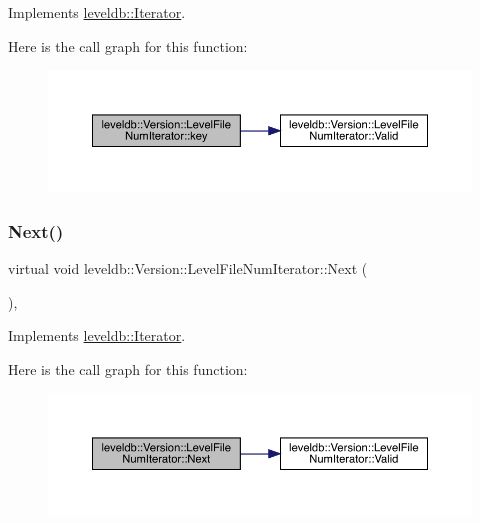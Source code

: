 Implements \mbox{\hyperlink{classleveldb_1_1_iterator_ad17feced6e24a1b21db5ae6940c1f220}{leveldb\+::\+Iterator}}.

Here is the call graph for this function\+:
\nopagebreak
\begin{figure}[H]
\begin{center}
\leavevmode
\includegraphics[width=350pt]{classleveldb_1_1_version_1_1_level_file_num_iterator_af89babdc6efb44a125b9ec597fc96bd8_cgraph}
\end{center}
\end{figure}
\mbox{\label{classleveldb_1_1_version_1_1_level_file_num_iterator_a7f470d4bd4dd27ff653bd1e61ccfd759}} 
\subsubsection{\texorpdfstring{Next()}{Next()}}
{\footnotesize\ttfamily virtual void leveldb\+::\+Version\+::\+Level\+File\+Num\+Iterator\+::\+Next (\begin{DoxyParamCaption}{ }\end{DoxyParamCaption})\hspace{0.3cm}{\ttfamily [inline]}, {\ttfamily [virtual]}}



Implements \mbox{\hyperlink{classleveldb_1_1_iterator_aea54a5ca7eb942eb15770820529410e7}{leveldb\+::\+Iterator}}.

Here is the call graph for this function\+:
\nopagebreak
\begin{figure}[H]
\begin{center}
\leavevmode
\includegraphics[width=350pt]{classleveldb_1_1_version_1_1_level_file_num_iterator_a7f470d4bd4dd27ff653bd1e61ccfd759_cgraph}
\end{center}
\end{figure}
\mbox{\label{classleveldb_1_1_version_1_1_level_file_num_iterator_ab39c60a98d579590231034fdb665cb42}} 
